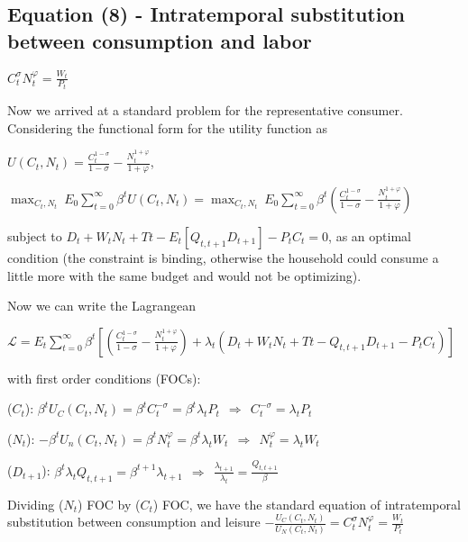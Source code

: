 \documentclass[
]{article}
\begin{document}
\hypertarget{equation-8---intratemporal-substitution-between-consumption-and-labor}{%
\subsection{Equation (8) - Intratemporal substitution between
consumption and
labor}\label{equation-8---intratemporal-substitution-between-consumption-and-labor}}

\(\displaystyle C_t^{\sigma}N_t^{\varphi} = \frac{W_t}{P_t}\)

\vspace{8pt}

Now we arrived at a standard problem for the representative consumer.
Considering the functional form for the utility function as

\(\displaystyle U(C_t,N_t)=\frac{C_t^{1-\sigma}}{1-\sigma}-\frac{N_t^{1+\varphi}}{1+\varphi}\),

\(\displaystyle \max_{C_t,N_t}\ E_0 \sum_{t=0}^\infty \beta^t U(C_t,N_t) = \displaystyle \max_{C_t,N_t} \ E_0 \sum_{t=0}^\infty \beta^t \left( \frac{C_t^{1-\sigma}}{1-\sigma}-\frac{N_t^{1+\varphi}}{1+\varphi} \right)\)

subject to
\(\displaystyle D_t + W_tN_t + Tt - E_t[ Q_{t,t+1}D_{t+1}] - P_t C_t = 0\),
as an optimal condition (the constraint is binding, otherwise the
household could consume a little more with the same budget and would not
be optimizing).

Now we can write the Lagrangean

\(\mathcal{L} = \displaystyle E_t \sum_{t=0}^\infty \beta^t \left[ \left( \frac{C_t^{1-\sigma}}{1-\sigma}-\frac{N_t^{1+\varphi}}{1+\varphi} \right) + \lambda_t \left( D_t + W_tN_t + Tt - Q_{t,t+1}D_{t+1} - P_t C_t \right) \right]\)

with first order conditions (FOCs):

(\(C_t\)):
\(\displaystyle \beta^t U_C(C_t,N_t)= \beta^tC_t^{-\sigma} = \beta^t \lambda_t P_t \ \ \Rightarrow \ \ C_t^{-\sigma} = \lambda_t P_t\)

(\(N_t\)):
\(\displaystyle -\beta^t U_n(C_t,N_t)=\beta^tN_t^{\varphi} = \beta^t \lambda_t W_t \ \ \Rightarrow \ \ N_t^{\varphi} = \lambda_t W_t\)

(\(D_{t+1}\)):
\(\displaystyle \beta^t \lambda_t Q_{t,t+1} = \beta^{t+1} \lambda_{t+1} \ \ \Rightarrow \ \ \frac{\lambda_{t+1}}{\lambda_t} = \frac{Q_{t,t+1}}{\beta}\)

Dividing (\(N_t\)) FOC by (\(C_t\)) FOC, we have the standard equation
of intratemporal substitution between consumption and leisure
\(\displaystyle -\frac{U_C(C_t,N_t)}{U_N(C_t,N_t)} =C_t^{\sigma}N_t^{\varphi} = \frac{W_t}{P_t}\)
\end{document}
